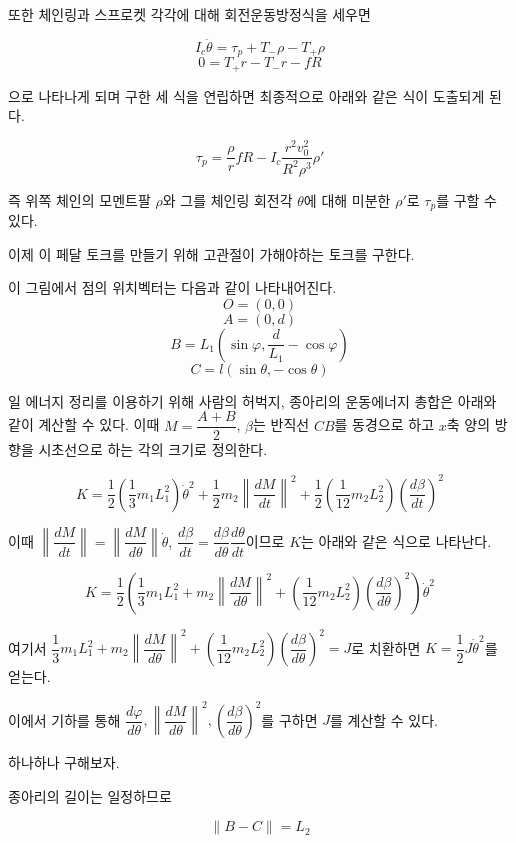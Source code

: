 또한 체인링과 스프로켓 각각에 대해 회전운동방정식을 세우면


\[I_c\ddot{\theta} = \tau_p+T_-\rho-T_+\rho\]
\[0 = T_+r-T_-r-fR\]


으로 나타나게 되며 구한 세 식을 연립하면 최종적으로 아래와 같은 식이 도출되게 된다.

\begin{equation}
    \tau_p=\frac{\rho}{r}fR-I_c\frac{r^2v_0^2}{R^2\rho^3}\rho'
    \label{eq:tau_p}
\end{equation}

즉 위쪽 체인의 모멘트팔 \(\rho\)와 그를 체인링 회전각 \(\theta\)에 대해 미분한 \(\rho'\)로 \(\tau_p\)를 구할 수 있다.

이제 이 페달 토크를 만들기 위해 고관절이 가해야하는 토크를 구한다.

이 그림에서 점의 위치벡터는 다음과 같이 나타내어진다.
\[O = (0,0)\]
\[A = (0,d)\]
\[B = L_1(\sin\varphi,\dfrac{d}{L_1}-\cos\varphi)\]
\[C = l(\sin\theta,-\cos\theta)\]


일 에너지 정리를 이용하기 위해 사람의 허벅지, 종아리의 운동에너지 총합은 아래와 같이 계산할 수 있다. 이때 \(M = \dfrac{A+B}{2}\), \(\beta\)는 반직선 \(CB\)를 동경으로 하고 \(x\)축 양의 방향을 시초선으로 하는 각의 크기로 정의한다.

\[K = \dfrac12\left(\dfrac13m_1L_1^2\right)\dot{\theta}^2+\dfrac12m_2\left\|\dfrac{dM}{dt}\right\|^2+\dfrac12\left(\dfrac{1}{12}m_2L_2^2\right)\left(\dfrac{d\beta}{dt}\right)^2\]

이때 \(\left\| \dfrac{dM}{dt} \right\|  = \left\| \dfrac{dM}{d\theta} \right\|\dot{\theta}\), \(\dfrac{d\beta}{dt} = \dfrac{d\beta}{d\theta}\dfrac{d\theta}{dt}\)이므로 \(K\)는 아래와 같은 식으로 나타난다.

\[K = \dfrac12\left(\dfrac13m_1L_1^2+m_2\left\|\dfrac{dM}{d\theta}\right\|^2+\left(\dfrac{1}{12}m_2L_2^2\right)\left(\dfrac{d\beta}{d\theta}\right)^2\right)\dot{\theta}^2\]

여기서 \(\dfrac13m_1L_1^2+m_2\left\|\dfrac{dM}{d\theta}\right\|^2+\left(\dfrac{1}{12}m_2L_2^2\right)\left(\dfrac{d\beta}{d\theta}\right)^2 = J\)로 치환하면 \(K = \dfrac12J\dot{\theta}^2\)를 얻는다.

이에서 기하를 통해 \(\dfrac{d\varphi}{d\theta}, \left\|\dfrac{dM}{d\theta}\right\|^2, \left(\dfrac{d\beta}{d\theta}\right)^2\)를 구하면 \(J\)를 계산할 수 있다.

하나하나 구해보자.

종아리의 길이는 일정하므로

\[\|B-C\| = L_2\]


